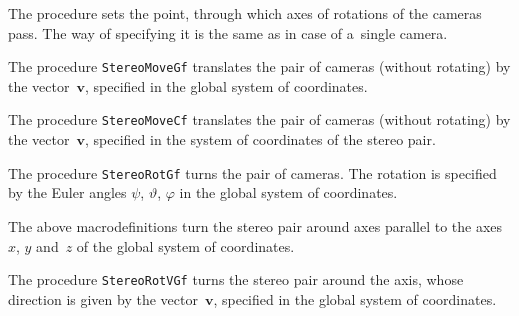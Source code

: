 \newpage
The procedure sets the point, through which axes of rotations of the cameras
pass. The way of specifying it is the same as in case of a~single camera.   

\vspace{\bigskipamount}
The procedure \texttt{StereoMoveGf} translates the pair of cameras
(without rotating) by the vector~$\bm{v}$, specified in the global
system of coordinates.

\vspace{\bigskipamount}
The procedure \texttt{StereoMoveCf} translates the pair of cameras
(without rotating) by the vector~$\bm{v}$, specified in the
system of coordinates of the stereo pair.

\vspace{\bigskipamount}
The procedure \texttt{StereoRotGf} turns the pair of cameras. The rotation
is specified by the Euler angles $\psi$, $\vartheta$, $\varphi$ in the
global system of coordinates.

\vspace{\bigskipamount}
The above macrodefinitions turn the stereo pair around axes parallel to the
axes $x$, $y$ and~$z$ of the global system of coordinates.

\vspace{\bigskipamount}
The procedure \texttt{StereoRotVGf} turns the stereo pair around the axis,
whose direction is given by the vector~$\bm{v}$, specified in the global  
system of coordinates.


